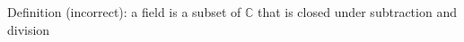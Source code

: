 \documentclass[preview]{standalone}
\begin{document}
\begin{center}
Definition (incorrect): a field is a subset of $\mathbb{C}$ that is closed under subtraction and division
\end{center}
\end{document}
